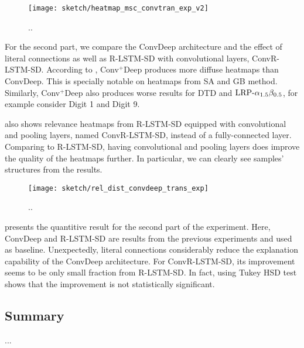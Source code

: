  \begin{figure}[!htb]
\centering
\texttt{[image: sketch/heatmap\_msc\_convtran\_exp\_v2]}
\caption{..} 
\label{fig:heatmap_msc_convtran_exp}
\end{figure}
For the second part, we compare the ConvDeep architecture and the effect of literal connections as well as R-LSTM-SD with convolutional layers, ConvR-LSTM-SD. According to \addfigure{\ref{fig:heatmap_msc_convtran_exp}}, Conv$^+$Deep produces more diffuse heatmaps than ConvDeep. This is specially notable on heatmaps from SA  and GB method. Similarly, Conv$^+$Deep also produces worse results for DTD and $\text{LRP-}\alpha_{1.5}\beta_{0.5}$, for example consider Digit 1 and Digit 9.

\addfigure{\ref{fig:heatmap_msc_convtran_exp}} also shows relevance heatmaps from R-LSTM-SD equipped with convolutional and pooling layers, named ConvR-LSTM-SD, instead of a fully-connected layer. Comparing to R-LSTM-SD, having convolutional and pooling layers does improve  the quality of the heatmaps further. In particular, we can clearly see samples' structures from the results.

 \begin{figure}[!htb]
\centering
\texttt{[image: sketch/rel\_dist\_convdeep\_trans\_exp]}
\caption{..} 
\label{fig:rel_dist_convdeep_trans_exp}
\end{figure}

\addfigure{\ref{fig:rel_dist_convdeep_trans_exp}} presents the quantitive result for the second part of the experiment. Here, ConvDeep and R-LSTM-SD are results from the previous experiments and used as baseline. Unexpectedly, literal connections considerably reduce the explanation capability of the ConvDeep architecture. For ConvR-LSTM-SD, its improvement seems to be only small fraction from R-LSTM-SD. In fact, using Tukey HSD test shows that the improvement is not statistically significant.



\subsection{Summary}
... 